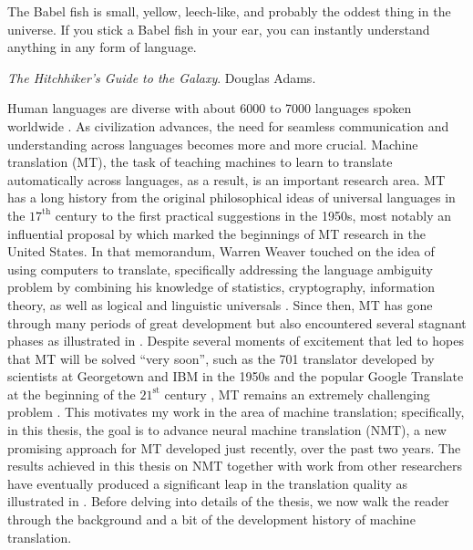 \epigraph{The Babel fish is small, yellow, leech-like, and probably the oddest
thing in the universe. 
If you stick a Babel fish in your ear, you can
instantly understand anything in any form of language.}{{\it The Hitchhiker's
Guide to the Galaxy}. Douglas Adams.}
Human languages are diverse %
with about 6000 to 7000
languages spoken worldwide \cite{languages}.
As civilization advances, the need for seamless communication and understanding across
languages becomes more and more crucial. Machine translation (MT), the
task of teaching machines to learn to translate automatically across languages, as
a result, is an important research area.
MT has a long history \cite{hutchins07} from the original
philosophical ideas of universal languages in the $17^{\text{th}}$ century to
the first practical suggestions in the 1950s, most notably an influential %
proposal by  which marked the beginnings of MT research in
the United States. In that memorandum, Warren Weaver touched on
the idea of using computers to translate, specifically addressing the language
ambiguity problem by combining his knowledge of statistics,
cryptography, information theory, as well as logical and linguistic universals
\cite{hutchins2000early}.
Since then, MT has gone through many
periods of great development but also encountered several stagnant phases as
illustrated in .
Despite several moments of excitement that led to hopes that MT
will be solved ``very soon'', such as the 701 translator \cite{ibm701}
developed by scientists at Georgetown and IBM in the 1950s and the popular Google Translate
at the beginning of the $21^{\text{st}}$ century \cite{brants07},
MT remains an extremely challenging problem \cite{solvemt,winograd_mt16}.
This motivates my work in the area of machine translation; specifically,
in this thesis, the goal is to advance neural machine translation (NMT), a new
promising approach for MT developed just recently, over the past two years. The results achieved in this
thesis on NMT together with work from other researchers have eventually
 produced a significant leap in the translation quality as illustrated in
. Before delving into details of the thesis, we now walk
the reader through the background and a bit of the development history of
machine translation.

